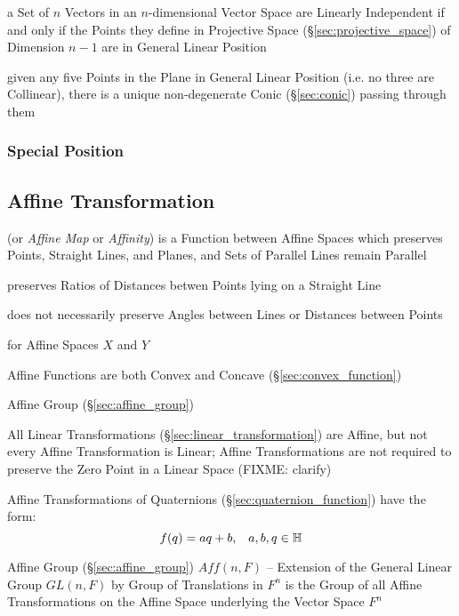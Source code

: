 a Set of $n$ Vectors in an $n$-dimensional Vector Space are Linearly
Independent if and only if the Points they define in Projective Space
(\S\ref{sec:projective_space}) of Dimension $n-1$ are in General Linear
Position

given any five Points in the Plane in General Linear Position (i.e. no three
are Collinear), there is a unique non-degenerate Conic (\S\ref{sec:conic})
passing through them



\subsubsection{Special Position}\label{sec:special_position}



\subsection{Affine Transformation}\label{sec:affine_transformation}

(or \emph{Affine Map} or \emph{Affinity}) is a Function between Affine
Spaces which preserves Points, Straight Lines, and Planes, and Sets of
Parallel Lines remain Parallel

preserves Ratios of Distances betwen Points lying on a Straight Line

does not necessarily preserve Angles between Lines or Distances
between Points

for Affine Spaces $X$ and $Y$

Affine Functions are both Convex and Concave (\S\ref{sec:convex_function})

\fist Affine Group (\S\ref{sec:affine_group})

\fist All Linear Transformations (\S\ref{sec:linear_transformation}) are
Affine, but not every Affine Transformation is Linear; Affine Transformations
are not required to preserve the Zero Point in a Linear Space (FIXME: clarify)

Affine Transformations of Quaternions (\S\ref{sec:quaternion_function}) have
the form:
\[
  f(q) = aq + b, \;\;\; a,b,q \in \mathbb{H}
\]

Affine Group (\S\ref{sec:affine_group}) $Aff(n,F)$ -- Extension of the General
Linear Group $GL(n,F)$ by Group of Translations in $F^n$ is the Group of all
Affine Transformations on the Affine Space underlying the Vector Space $F^n$

